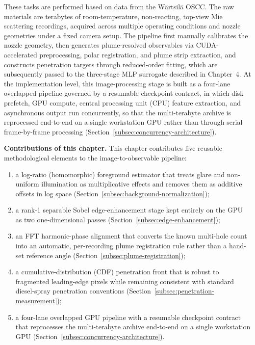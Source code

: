 These tasks are performed based on data from the Wärtsilä OSCC.
The raw materials are terabytes of room-temperature, non-reacting, top-view Mie scattering recordings, acquired across multiple operating conditions and nozzle geometries under a fixed camera setup.
The pipeline first manually calibrates the nozzle geometry, then generates plume-resolved observables via CUDA-accelerated preprocessing, polar registration, and plume strip extraction,
and constructs penetration targets through reduced-order fitting, which are subsequently passed to the three-stage MLP surrogate described in Chapter~4.
At the implementation level, this image-processing stage is built as a four-lane overlapped pipeline governed by a resumable checkpoint contract, in which disk prefetch, GPU compute, central processing unit (CPU) feature extraction, and asynchronous output run concurrently, so that the multi-terabyte archive is reprocessed end-to-end on a single workstation GPU rather than through serial frame-by-frame processing (Section~\ref{subsec:concurrency-architecture}).

\smallskip\noindent\textbf{Contributions of this chapter.} This chapter contributes five reusable methodological elements to the image-to-observable pipeline:
\begin{enumerate}
  \item a log-ratio (homomorphic) foreground estimator that treats glare and non-uniform illumination as multiplicative effects and removes them as additive offsets in log space (Section~\ref{subsec:background-normalization});
  \item a rank-1 separable Sobel edge-enhancement stage kept entirely on the GPU as two one-dimensional passes (Section~\ref{subsec:edge-enhancement});
  \item an FFT harmonic-phase alignment that converts the known multi-hole count into an automatic, per-recording plume registration rule rather than a hand-set reference angle (Section~\ref{subsec:plume-registration});
  \item a cumulative-distribution (CDF) penetration front that is robust to fragmented leading-edge pixels while remaining consistent with standard diesel-spray penetration conventions (Section~\ref{subsec:penetration-measurement});
  \item a four-lane overlapped GPU pipeline with a resumable checkpoint contract that reprocesses the multi-terabyte archive end-to-end on a single workstation GPU (Section~\ref{subsec:concurrency-architecture}).
\end{enumerate}

